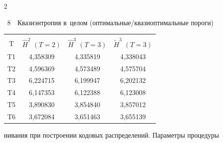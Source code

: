 \begin{multicols}{2}
\pagebreak



{\small   %

 \noindent

{{\tablename~8}\ \ \small{Квазиэнтропия в~целом (оптимальные/квазиоптимальные пороги)}}




\begin{center}

\tabcolsep=10pt

\begin{tabular}{|c|c|c|c|}

\hline

&&&\\[-9pt]

T  & $\hat{H}^2$ $(T=2)$ & $\hat{H}^3$ $(T=3)$ &  $\tilde{H}^3$ $(T=3)$\\

\hline

T1 & 4,358309 & 4,335819 & 4,338043 \\


T2 & 4,596369 & 4,573489 & 4,575704 \\


T3 & 6,224715 & 6,199947 & 6,202132 \\


T4 & 6,147353 & 6,122388 & 6,123008 \\


T5 & 3,890830 & 3,854840 & 3,857012 \\


T6 & 3,672084 & 3,651463 & 3,655139 \\

\hline

\end{tabular}

\end{center}

\vspace*{16pt}

}







\noindent

нивания при построении кодовых распределений. Параметры процедуры 


\end{multicols}
